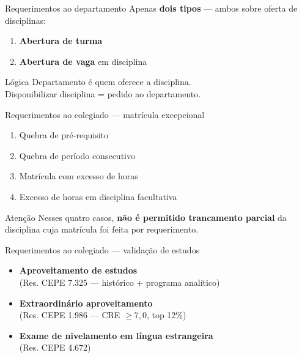 \documentclass[aspectratio=169]{beamer}
\newcommand{\impt}[1]{\textcolor{maccent}{\textbf{#1}}}
\newcommand{\ntc}[1]{\textcolor{mprimary}{#1}}
\begin{document}
\begin{frame}{Requerimentos ao departamento}
  Apenas \impt{dois tipos} --- ambos sobre oferta de disciplinas:
  \begin{enumerate}
    \item \impt{Abertura de turma}
    \item \impt{Abertura de vaga} em disciplina
  \end{enumerate}

  \vspace{0.4cm}
   
  \begin{block}{Lógica}
    Departamento é quem oferece a disciplina.\\
    \ntc{Disponibilizar disciplina = pedido ao departamento.}
  \end{block}
\end{frame}

\begin{frame}{Requerimentos ao colegiado --- matrícula excepcional}
  \begin{enumerate}
    \item Quebra de pré-requisito
    \item Quebra de período consecutivo
    \item Matrícula com excesso de horas
    \item Excesso de horas em disciplina facultativa
  \end{enumerate}

  \vspace{0.4cm}
   
  \begin{alertblock}{Atenção}
    Nesses quatro casos, \impt{não é permitido trancamento parcial} da disciplina cuja matrícula foi feita por requerimento.
  \end{alertblock}
\end{frame}

\begin{frame}{Requerimentos ao colegiado --- validação de estudos}
  \begin{itemize}
    \item \impt{Aproveitamento de estudos} \\
          \ntc{(Res. CEPE 7.325 --- histórico + programa analítico)}
    \item \impt{Extraordinário aproveitamento} \\
          \ntc{(Res. CEPE 1.986 --- CRE $\geq 7{,}0$, top 12\%)}
    \item \impt{Exame de nivelamento em língua estrangeira} \\
          \ntc{(Res. CEPE 4.672)}
  \end{itemize}
\end{frame}
\end{document}
